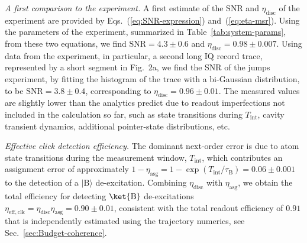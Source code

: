 \emph{A first comparison to the experiment. }A first estimate of the
SNR and $\eta_{\mathrm{disc}}$ of the experiment are provided by
Eqs.~(\ref{eq:SNR-expression}) and~(\ref{eq:eta-msr}). Using the
parameters of the experiment, summarized in Table~\ref{tab:system-params},
from these two equations, we find $\mathrm{SNR}=4.3\pm0.6$ and $\eta_{\mathrm{disc}}=0.98\pm0.007$.
Using data from the experiment, in particular, a second long IQ record
trace, represented by a short segment in Fig.~2a, we find the SNR
of the jumps experiment, by fitting the histogram of the trace with
a bi-Gaussian distribution, to be $\mathrm{SNR}=3.8\pm0.4$, corresponding
to $\eta_{\mathrm{\mathrm{disc}}}=0.96\pm0.01$. The measured values
are slightly lower than the analytics predict due to readout imperfections
not included in the calculation so far, such as state transitions
during $T_{\mathrm{int}}$, cavity transient dynamics, additional
pointer-state distributions, etc.

\emph{Effective click detection efficiency. }The dominant next-order
error is due to atom state transitions during the measurement window,
$T_{\mathrm{int}}$, which contributes an assignment error of approximately
$1-\eta_{\mathrm{asg}}=1-\exp\left(T_{\mathrm{int}}/\tau_{\mathrm{B}}\right)=0.06\pm0.001$
to the detection of a $|\mathrm{B}\rangle$ de-excitation. Combining
$\eta_{\mathrm{disc}}$ with $\eta_{\mathrm{asg}}$, we obtain the
total efficiency for detecting $\ket{\mathrm{B}}$ de-excitations
$\eta_{\mathrm{eff,clk}}=\eta_{\mathrm{disc}}\eta_{\mathrm{asg}}=0.90\pm0.01$,
consistent with the total readout efficiency of $0.91$ that is independently
estimated using the trajectory numerics, see Sec.~\ref{sec:Budget-coherence}.

